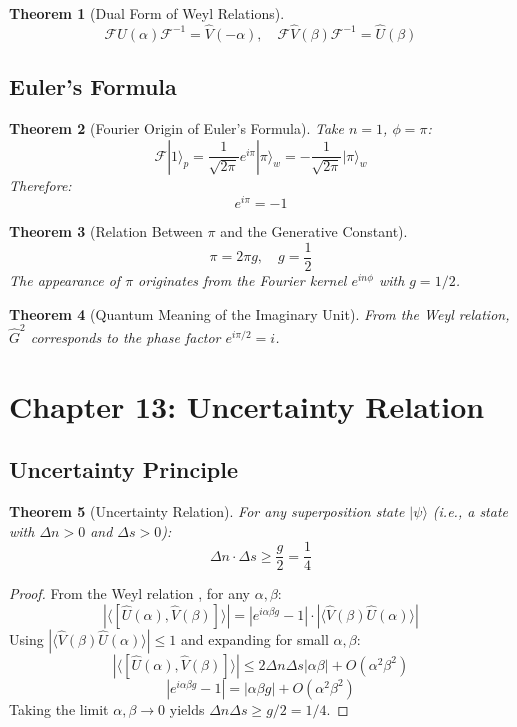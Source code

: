 \documentclass[12pt]{article}
\newtheorem{theorem}{Theorem}[section]
\theoremstyle{definition}
\begin{document}
\begin{theorem}[Dual Form of Weyl Relations]
\[
\mathcal{F}\hat{U}(\alpha)\mathcal{F}^{-1} = \hat{V}(-\alpha),\quad \mathcal{F}\hat{V}(\beta)\mathcal{F}^{-1} = \hat{U}(\beta)
\]
\end{theorem}

\subsection{Euler's Formula}

\begin{theorem}[Fourier Origin of Euler's Formula]
Take \(n=1\), \(\phi = \pi\):
\[
\mathcal{F}|1\rangle_p = \frac{1}{\sqrt{2\pi}} e^{i\pi}|\pi\rangle_w = -\frac{1}{\sqrt{2\pi}}|\pi\rangle_w
\]
Therefore:
\[
e^{i\pi} = -1
\]
\end{theorem}

\begin{theorem}[Relation Between \(\pi\) and the Generative Constant]
\[
\pi = 2\pi g,\quad g = \frac{1}{2}
\]
The appearance of \(\pi\) originates from the Fourier kernel \(e^{in\phi}\) with \(g = 1/2\).
\end{theorem}

\begin{theorem}[Quantum Meaning of the Imaginary Unit]
From the Weyl relation, \(\hat{G}^2\) corresponds to the phase factor \(e^{i\pi/2} = i\).
\end{theorem}

\section{Chapter 13: Uncertainty Relation}

\subsection{Uncertainty Principle}

\begin{theorem}[Uncertainty Relation]
For any superposition state \(|\psi\rangle\) (i.e., a state with \(\Delta n > 0\) and \(\Delta s > 0\)):
\[
\Delta n \cdot \Delta s \geq \frac{g}{2} = \frac{1}{4}
\]
\end{theorem}

\begin{proof}
From the Weyl relation , for any \(\alpha,\beta\):
\[
|\langle [\hat{U}(\alpha), \hat{V}(\beta)] \rangle| = |e^{i\alpha\beta g} - 1| \cdot |\langle \hat{V}(\beta)\hat{U}(\alpha) \rangle|
\]
Using \(|\langle \hat{V}(\beta)\hat{U}(\alpha) \rangle| \leq 1\) and expanding for small \(\alpha,\beta\):
\[
|\langle [\hat{U}(\alpha), \hat{V}(\beta)] \rangle| \leq 2\Delta n \Delta s |\alpha\beta| + O(\alpha^2\beta^2)
\]
\[
|e^{i\alpha\beta g} - 1| = |\alpha\beta g| + O(\alpha^2\beta^2)
\]
Taking the limit \(\alpha,\beta \to 0\) yields \(\Delta n \Delta s \geq g/2 = 1/4\).
\end{proof}
\end{document}
